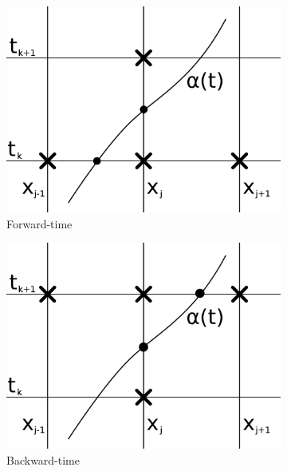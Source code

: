 \begin{figure}[h]
    \centering
    \begin{subfigure}[b]{0.3\textwidth}
        \includegraphics[width=\textwidth]{diagrams/GridFD}
        \caption{Forward-time}
        \label{fig:FDGrid}
    \end{subfigure}
    \begin{subfigure}[b]{0.3\textwidth}
        \includegraphics[width=\textwidth]{diagrams/GridBD}
        \caption{Backward-time}
        \label{fig:BDGrid}
    \end{subfigure}
    \begin{subfigure}[b]{0.3\textwidth}

\end{subfigure}
\end{figure}
